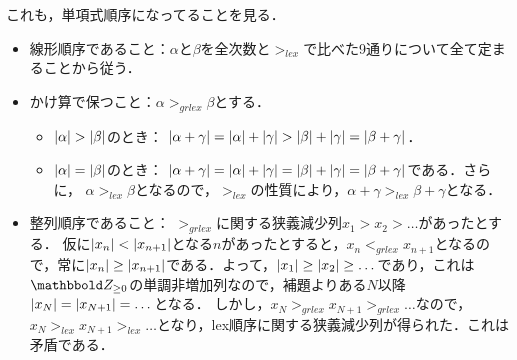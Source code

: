 \documentclass[9pt]{ltjsarticle}
\begin{document}
これも，単項式順序になってることを見る．
\begin{myproof}
 \begin{itemize}
  \item 線形順序であること：$\alpha$と$\beta$を全次数と$>_{lex}$で比べた9通りについて全て定まることから従う．
  \item かけ算で保つこと：$\alpha >_{grlex} \beta$とする．
\begin{itemize}
 \item $\myabs{\alpha}> \myabs{\beta}$のとき：
$\left|\alpha + \gamma\right| = \left|\alpha\right| + \left|\gamma\right| > \left|\beta\right|+\left|\gamma\right| = \left|\beta+\gamma\right|$．
 \item $\left|\alpha\right| = \left|\beta\right|$のとき：
$\left|\alpha + \gamma\right| = \left|\alpha\right| +\left|\gamma\right| = \left|\beta\right|+\left|\gamma\right| = \left|\beta + \gamma\right|$である．さらに，
$\alpha >_{lex} \beta$となるので，$>_{lex}$の性質により，$\alpha + \gamma >_{lex} \beta + \gamma$となる．
\end{itemize}
  \item 整列順序であること：
$>_{grlex}$に関する狭義減少列$x_1 > x_2 > \dots$があったとする．
仮に$\left|x_n\right| < \left|x_{n+1}\right|$となる$n$があったとすると，$x_n <_{grlex} x_{n+1}$となるので，常に$\left|x_n\right| \ge \left|x_{n+1}\right|$である．よって，$\left|x_1\right| \ge \left|x_2\right| \ge \dots$であり，これは$\Zge$の単調非増加列なので，補題よりある$N$以降$\left|x_{N}\right|=\left|x_{N+1}\right|=\dots$となる．
しかし，$x_N >_{grlex} x_{N+1} >_{grlex} \dots$なので，$x_{N} >_{lex} x_{N+1} >_{lex} \dots$となり，lex順序に関する狭義減少列が得られた．これは矛盾である．
 \end{itemize}
\end{myproof}
\end{document}
